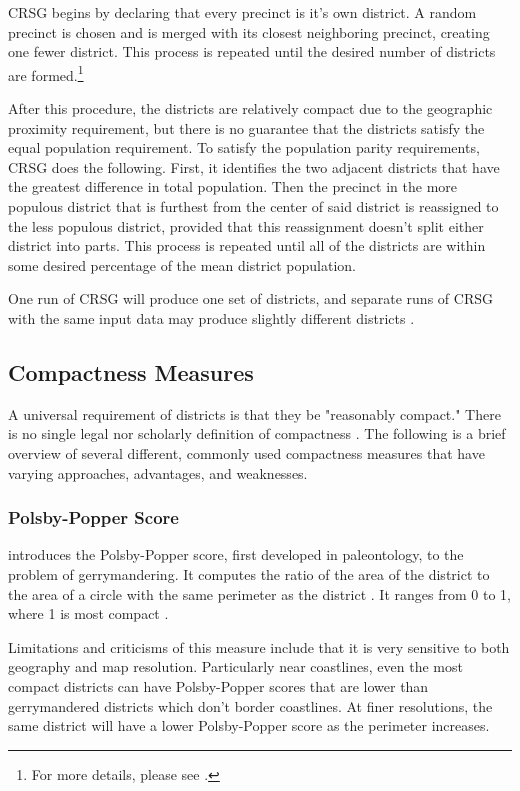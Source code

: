 CRSG begins by declaring that every precinct is it's own district. A random precinct is chosen and is merged with its closest neighboring precinct, creating one fewer district. This process is repeated until the desired number of districts are formed.\footnote{For more details, please see \textcite{chen2013}.} \parencite{chen2013}

After this procedure, the districts are relatively compact due to the geographic proximity requirement, but there is no guarantee that the districts satisfy the equal population requirement. To satisfy the population parity requirements, CRSG does the following. First, it identifies the two adjacent districts that have the greatest difference in total population. Then the precinct in the more populous district that is furthest from the center of said district is reassigned to the less populous district, provided that this reassignment doesn't split either district into parts. This process is repeated until all of the districts are within some desired percentage of the mean district population. \parencite{chen2013}

One run of CRSG will produce one set of districts, and separate runs of CRSG with the same input data may produce slightly different districts \parencite{chen2013}.

\subsection{Compactness Measures}

A universal requirement of districts is that they be "reasonably compact." There is no single legal nor scholarly definition of compactness \parencite{katz2020}. The following is a brief overview of several different, commonly used compactness measures that have varying approaches, advantages, and weaknesses.

\subsubsection{Polsby-Popper Score}
\label{sec:polsbypopper}

\textcite{polsby1991} introduces the Polsby-Popper score, first developed in paleontology, to the problem of gerrymandering. It computes the ratio of the area of the district to the area of a circle with the same perimeter as the district \parencite{cox1927,polsby1991}. It ranges from 0 to 1, where 1 is most compact \parencite{polsby1991}.

Limitations and criticisms of this measure include that it is very sensitive to both geography and map resolution. Particularly near coastlines, even the most compact districts can have Polsby-Popper scores that are lower than gerrymandered districts which don't border coastlines. At finer resolutions, the same district will have a lower Polsby-Popper score as the perimeter increases. \parencite{mccartan2020}

